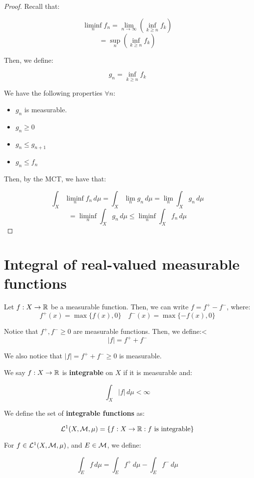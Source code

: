 \begin{proof}
    Recall that:

    $$\liminf_{n} f_n = \lim_{n \to \infty} \left(\inf_{k \geq n} f_k\right)$$
    $$= \sup_{n} \left(\inf_{k \geq n} f_k\right)$$

    Then, we define:

    $$g_n = \inf_{k \geq n} f_k$$

    We have the following properties $\forall n$:

    \begin{itemize}
        \item $g_n$ is measurable.
        
        \item $g_n \geq 0$
        
        \item $g_n \leq g_{n+1}$ 
        
        \item $g_n \leq f_n$
    \end{itemize}

    Then, by the MCT, we have that:

    $$\int_{X} \liminf_{n} f_n \, d\mu = \int_{X} \lim_{n} g_n \, d\mu = \lim_{n} \int_{X} g_n \, d\mu$$
    $$= \liminf_{n} \int_{X} g_n \, d\mu \leq \liminf_{n} \int_{X} f_n \, d\mu$$
\end{proof}

\section{Integral of real-valued measurable functions}

Let $f: X \to \mathbb{R}$ be a measurable function. Then, we can write $f = f^+ - f^-$, where:
$$f^+(x) = \max\{f(x), 0\} \quad f^-(x) = \max\{-f(x), 0\}$$

Notice that $f^+, f^- \geq 0$ are measurable functions. Then, we define:<
$$|f| = f^+ + f^-$$

We also notice that $|f| = f^+ + f^- \geq 0$ is measurable. 

\begin{fdefinition}
    We say $f: X \to \mathbb{R}$ is \textbf{integrable} on $X$ if it is measurable and:
    
    $$\int_{X} |f| \, d\mu < \infty$$

    We define the set of \textbf{integrable functions} as:

    $$\mathcal{L}^1(X, \mathcal{M}, \mu) = \{f: X \to \mathbb{R}: f \text{ is integrable}\}$$

    For $f \in \mathcal{L}^1(X, \mathcal{M}, \mu)$, and $E \in \mathcal{M}$, we define:

    $$\int_{E} f \, d\mu = \int_{E} f^+ \, d\mu - \int_{E} f^- \, d\mu$$

\end{fdefinition}

